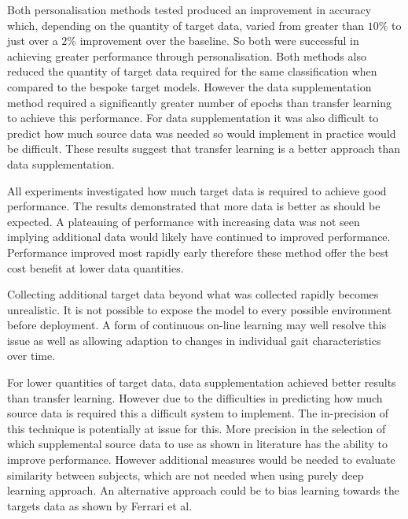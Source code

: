 Both personalisation methods tested produced an improvement in accuracy which, depending on the quantity of target data, varied from greater than $10\%$ to just over a $2\%$ improvement over the baseline. So both were successful in achieving greater performance through personalisation. Both methods also reduced the quantity of target data required for the same classification when compared to the bespoke target models. However the data supplementation method required a significantly greater number of epochs than transfer learning to achieve this performance. For data supplementation it was also difficult to predict how much source data was needed so would implement in practice would be difficult. These results suggest that transfer learning is a better approach than data supplementation.

All experiments investigated how much target data is required to achieve good performance. The results demonstrated that more data is better as should be expected. A plateauing of performance with increasing data was not seen implying additional data would likely have continued to improved performance. Performance improved most rapidly early therefore these method offer the best cost benefit at lower data quantities.

Collecting additional target data beyond what was collected rapidly becomes unrealistic. It is not possible to expose the model to every possible environment before deployment. A form of continuous on-line learning may well resolve this issue as well as allowing adaption to changes in individual gait characteristics over time.

For lower quantities of target data, data supplementation achieved better results than transfer learning. However due to the difficulties in predicting how much source data is required this a difficult system to implement. The in-precision of this technique is potentially at issue for this. More precision in the selection of which supplemental source data to use as shown in literature has the ability to improve performance. However additional measures would be needed to evaluate similarity between subjects, which are not needed when using purely deep learning approach. An alternative approach could be to bias learning towards the targets data as shown by Ferrari et al\cite{Ferrari2020}.

